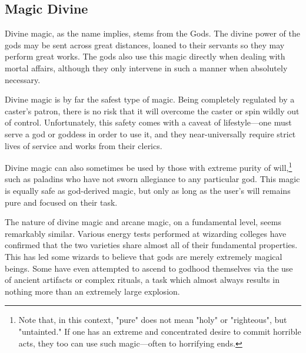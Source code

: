 \begin{multicols}{2}
\section{Magic Divine}
Divine magic, as the name implies, stems from the Gods.
The divine power of the gods may be sent across great distances, loaned to their servants so they may perform great works.
The gods also use this magic directly when dealing with mortal affairs, although they only intervene in such a manner when absolutely necessary.

Divine magic is by far the safest type of magic.
Being completely regulated by a caster's patron, there is no risk that it will overcome the caster or spin wildly out of control.
Unfortunately, this safety comes with a caveat of lifestyle---one must serve a god or goddess in order to use it, and they near-universally require strict lives of service and works from their clerics.

Divine magic can also sometimes be used by those with extreme purity of will,\footnote{Note that, in this context, "pure" does not mean "holy" or "righteous", but "untainted." If one has an extreme and concentrated desire to commit horrible acts, they too can use such magic---often to horrifying ends.} such as paladins who have not sworn allegiance to any particular god.
This magic is equally safe as god-derived magic, but only as long as the user's will remains pure and focused on their task.

The nature of divine magic and arcane magic, on a fundamental level, seems remarkably similar.
Various energy tests performed at wizarding colleges have confirmed that the two varieties share almost all of their fundamental properties.
This has led some wizards to believe that gods are merely extremely magical beings.
Some have even attempted to ascend to godhood themselves via the use of ancient artifacts or complex rituals, a task which almost always results in nothing more than an extremely large explosion.
\end{multicols}
 

